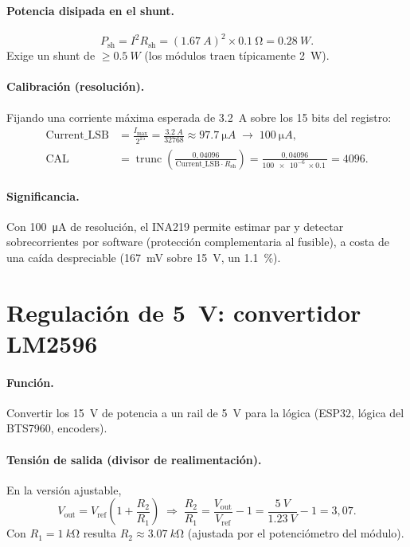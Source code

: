 \documentclass[11pt,letterpaper]{article}
\begin{document}
\paragraph{Potencia disipada en el shunt.}
\begin{equation}
  P_\text{sh} = I^2 R_\text{sh}
  = (\SI{1.67}{A})^2\times\SI{0.1}{\ohm} = \SI{0.28}{W}.
\end{equation}
Exige un shunt de $\ge\SI{0.5}{W}$ (los módulos traen típicamente \SI{2}{W}).

\paragraph{Calibración (resolución).} Fijando una corriente máxima esperada de
\SI{3.2}{A} sobre los 15 bits del registro:
\begin{align}
  \text{Current\_LSB} &= \frac{I_\text{max}}{2^{15}}
     = \frac{\SI{3.2}{A}}{32768} \approx \SI{97.7}{\micro A}
     \;\to\; \SI{100}{\micro A}, \\[2pt]
  \text{CAL} &= \operatorname{trunc}\!\left(
     \frac{0{,}04096}{\text{Current\_LSB}\cdot R_\text{sh}}\right)
     = \frac{0{,}04096}{\SI{100e-6}{}\times\SI{0.1}{}} = 4096.
\end{align}

\paragraph{Significancia.} Con \SI{100}{\micro A} de resolución, el INA219 permite
estimar par y detectar sobrecorrientes por software (protección complementaria al
fusible), a costa de una caída despreciable (\SI{167}{mV} sobre \SI{15}{V}, un
\SI{1.1}{\percent}).

\section{Regulación de \texorpdfstring{\SI{5}{V}}{5 V}: convertidor LM2596}
\paragraph{Función.} Convertir los \SI{15}{V} de potencia a un rail de \SI{5}{V}
para la lógica (ESP32, lógica del BTS7960, encoders).

\paragraph{Tensión de salida (divisor de realimentación).} En la versión ajustable,
\begin{equation}
  V_\text{out} = V_\text{ref}\left(1+\frac{R_2}{R_1}\right)
  \;\Rightarrow\;
  \frac{R_2}{R_1} = \frac{V_\text{out}}{V_\text{ref}}-1
  = \frac{\SI{5}{V}}{\SI{1.23}{V}}-1 = 3{,}07.
\end{equation}
Con $R_1=\SI{1}{k\ohm}$ resulta $R_2\approx\SI{3.07}{k\ohm}$ (ajustada por el
potenciómetro del módulo).
\end{document}
